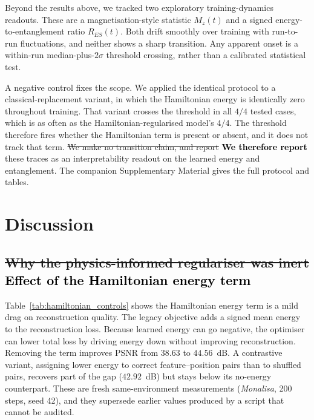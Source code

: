 \documentclass[pdflatex,sn-basic]{sn-jnl}
\newcommand{\del}[1]{\sout{#1}}
\newcommand{\add}[1]{\textbf{\textcolor{black}{#1}}}
\begin{document}
Beyond the results above, we tracked two exploratory training-dynamics readouts.
These are a magnetisation-style statistic $M_z(t)$ and a signed
energy-to-entanglement ratio $R_{ES}(t)$. Both drift smoothly over training with
run-to-run fluctuations, and neither shows a sharp transition. Any apparent onset
is a within-run median-plus-$2\sigma$ threshold crossing, rather than a
calibrated statistical test.

A negative control fixes the scope. We applied the identical protocol to a
classical-replacement variant, in which the Hamiltonian energy is identically
zero throughout training. That variant crosses the threshold in all $4/4$ tested
cases, which is as often as the Hamiltonian-regularised model's $4/4$. The
threshold therefore fires whether the Hamiltonian term is present or absent, and
it does not track that term. \del{We make no transition claim, and report} \add{We therefore report} these traces
as an interpretability readout on the learned energy and entanglement. The
companion Supplementary Material gives the full protocol and tables.

\section{Discussion}
\label{sec:discussion}

\subsection[Effect of the Hamiltonian energy term]{\del{Why the physics-informed regulariser was inert} \add{Effect of the Hamiltonian energy term}}
\label{sec:regularizer_inert}

Table~\ref{tab:hamiltonian_controls} shows the Hamiltonian energy term is a mild drag on reconstruction quality. The legacy objective adds a signed mean energy to the reconstruction loss. Because learned energy can go negative, the optimiser can lower total loss by driving energy down without improving reconstruction. Removing the term improves PSNR from $38.63$ to $44.56$~dB. A contrastive variant, assigning lower energy to correct feature--position pairs than to shuffled pairs, recovers part of the gap ($42.92$~dB) but stays below its no-energy counterpart. These are fresh same-environment measurements (\textit{Monalisa}, 200 steps, seed 42), and they supersede earlier values produced by a script that cannot be audited.
\end{document}

